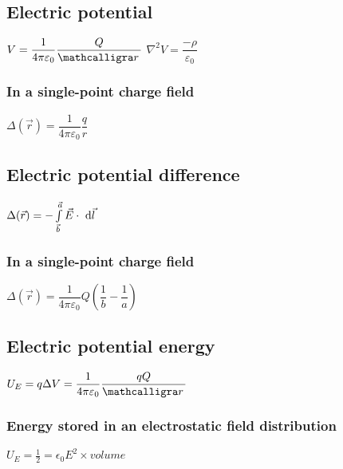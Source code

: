 		\subsection{Electric potential}
        
\begin{itemize}
\itemt \( V = \dfrac{1}{4\pi\varepsilon_0} \dfrac{Q}{\scriptr} \)
\itemt \( \nabla^2 V = \dfrac{-\rho}{\varepsilon_0} \)
\end{itemize}

\subsubsection{In a single-point charge field}
\begin{itemize}
\itemt \( \Delta (\vec{r}) = \dfrac{1}{4\pi\varepsilon_0}\dfrac{q}{r} \)
\end{itemize}
        
        \subsection{Electric potential difference}
        
\begin{itemize}
\itemt \( \Delta (\vec{r}) = - \int\limits_{\vec{b}}^{\vec{a}} \vec{E}\cdot\ \mathrm{d}\vec{l} \)
\end{itemize}

\subsubsection{In a single-point charge field}
\begin{itemize}
\itemt \( \Delta (\vec{r}) = \dfrac{1}{4\pi\varepsilon_0} Q (\dfrac{1}{b} - \dfrac{1}{a}) \)
\end{itemize}

		\subsection{Electric potential energy}
        
\begin{itemize}
\itemt \( U_E = q\Delta V = \dfrac{1}{4\pi \varepsilon_0} \dfrac{qQ}{\scriptr} \)
\end{itemize}

\subsubsection{Energy stored in an electrostatic field distribution}
\begin{itemize}
\itemt \( U_E = \frac{1}{2} =\epsilon_0 E^2 \times volume \)
\end{itemize}

